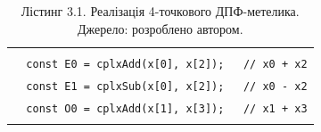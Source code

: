\documentclass[
]{article}
\newcommand{\passthrough}[1]{#1}
\begin{document}
\begin{longtable}[]{@{}
  >{\raggedright\arraybackslash}p{}@{}}
\caption[Лістинг 3.1. Реалізація 4-точкового ДПФ-метелика. Джерело:
розроблено автором.]{Лістинг 3.1. Реалізація 4-точкового ДПФ-метелика.
Джерело: розроблено автором.}\tabularnewline
\toprule\noalign{}
\endfirsthead
\endhead
\bottomrule\noalign{}
\endlastfoot
\begin{minipage}[t]{\linewidth}\raggedright
\passthrough{\lstinline!function!}\passthrough{\lstinline! !}\passthrough{\lstinline!computeDFT!}\passthrough{\lstinline!4(!}\passthrough{\lstinline!x!}\passthrough{\lstinline!:!}\passthrough{\lstinline! !}\passthrough{\lstinline!Complex!}\passthrough{\lstinline![4]):!}\passthrough{\lstinline! !}\passthrough{\lstinline!Complex!}\passthrough{\lstinline![4]!}\passthrough{\lstinline! !}\passthrough{\lstinline!\{!}\strut \\
\passthrough{\lstinline!  !}\passthrough{\lstinline!const!}\passthrough{\lstinline! !}\passthrough{\lstinline!E!}\passthrough{\lstinline!0!}\passthrough{\lstinline! !}\passthrough{\lstinline!=!}\passthrough{\lstinline! !}\passthrough{\lstinline!cplxAdd!}\passthrough{\lstinline!(!}\passthrough{\lstinline!x!}\passthrough{\lstinline![0],!}\passthrough{\lstinline! !}\passthrough{\lstinline!x!}\passthrough{\lstinline![2]);!}\passthrough{\lstinline!   !}\passthrough{\lstinline!//!}\passthrough{\lstinline! !}\passthrough{\lstinline!x!}\passthrough{\lstinline!0!}\passthrough{\lstinline! !}\passthrough{\lstinline!+!}\passthrough{\lstinline! !}\passthrough{\lstinline!x!}\passthrough{\lstinline!2!}\strut \\
\passthrough{\lstinline!  !}\passthrough{\lstinline!const!}\passthrough{\lstinline! !}\passthrough{\lstinline!E!}\passthrough{\lstinline!1!}\passthrough{\lstinline! !}\passthrough{\lstinline!=!}\passthrough{\lstinline! !}\passthrough{\lstinline!cplxSub!}\passthrough{\lstinline!(!}\passthrough{\lstinline!x!}\passthrough{\lstinline![0],!}\passthrough{\lstinline! !}\passthrough{\lstinline!x!}\passthrough{\lstinline![2]);!}\passthrough{\lstinline!   !}\passthrough{\lstinline!//!}\passthrough{\lstinline! !}\passthrough{\lstinline!x!}\passthrough{\lstinline!0!}\passthrough{\lstinline! !}\passthrough{\lstinline!-!}\passthrough{\lstinline! !}\passthrough{\lstinline!x!}\passthrough{\lstinline!2!}\strut \\
\passthrough{\lstinline!  !}\passthrough{\lstinline!const!}\passthrough{\lstinline! !}\passthrough{\lstinline!O!}\passthrough{\lstinline!0!}\passthrough{\lstinline! !}\passthrough{\lstinline!=!}\passthrough{\lstinline! !}\passthrough{\lstinline!cplxAdd!}\passthrough{\lstinline!(!}\passthrough{\lstinline!x!}\passthrough{\lstinline![1],!}\passthrough{\lstinline! !}\passthrough{\lstinline!x!}\passthrough{\lstinline![3]);!}\passthrough{\lstinline!   !}\passthrough{\lstinline!//!}\passthrough{\lstinline! !}\passthrough{\lstinline!x!}\passthrough{\lstinline!1!}\passthrough{\lstinline! !}\passthrough{\lstinline!+!}\passthrough{\lstinline! !}\passthrough{\lstinline!x!}\passthrough{\lstinline!3!}\strut \\

\end{minipage}
\end{longtable}
\end{document}
